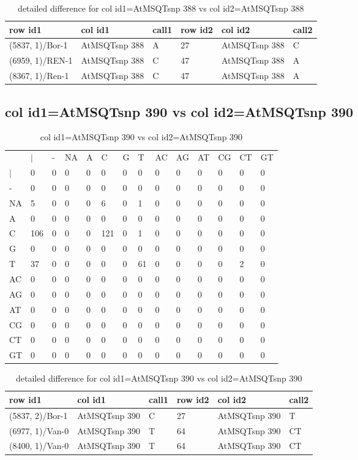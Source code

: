 \begin{center}
\begin{longtable}{|l|l|l|l|l|l|}
\caption{detailed difference for col id1=AtMSQTsnp 388 vs col id2=AtMSQTsnp 388} \label{table_dm895}\\
\hline
row id1&col id1&call1&row id2&col id2&call2\\
\hline
(5837, 1)/Bor-1&AtMSQTsnp 388&A&27&AtMSQTsnp 388&C\\
(6959, 1)/REN-1&AtMSQTsnp 388&C&47&AtMSQTsnp 388&A\\
(8367, 1)/Ren-1&AtMSQTsnp 388&C&47&AtMSQTsnp 388&A\\
\hline
\end{longtable}
\end{center}

\subsection{col id1=AtMSQTsnp 390 vs col id2=AtMSQTsnp 390}
\begin{center}
\begin{longtable}{|l|l|l|l|l|l|l|l|l|l|l|l|l|l|}
\caption{col id1=AtMSQTsnp 390 vs col id2=AtMSQTsnp 390} \label{table_dm896}\\
\hline
\\
\hline
&$|$&-&NA&A&C&G&T&AC&AG&AT&CG&CT&GT\\
$|$&0&0&0&0&0&0&0&0&0&0&0&0&0\\
-&0&0&0&0&0&0&0&0&0&0&0&0&0\\
NA&5&0&0&0&6&0&1&0&0&0&0&0&0\\
A&0&0&0&0&0&0&0&0&0&0&0&0&0\\
C&106&0&0&0&121&0&1&0&0&0&0&0&0\\
G&0&0&0&0&0&0&0&0&0&0&0&0&0\\
T&37&0&0&0&0&0&61&0&0&0&0&2&0\\
AC&0&0&0&0&0&0&0&0&0&0&0&0&0\\
AG&0&0&0&0&0&0&0&0&0&0&0&0&0\\
AT&0&0&0&0&0&0&0&0&0&0&0&0&0\\
CG&0&0&0&0&0&0&0&0&0&0&0&0&0\\
CT&0&0&0&0&0&0&0&0&0&0&0&0&0\\
GT&0&0&0&0&0&0&0&0&0&0&0&0&0\\
\hline
\end{longtable}
\end{center}

\begin{center}
\begin{longtable}{|l|l|l|l|l|l|}
\caption{detailed difference for col id1=AtMSQTsnp 390 vs col id2=AtMSQTsnp 390} \label{table_dm897}\\
\hline
row id1&col id1&call1&row id2&col id2&call2\\
\hline
(5837, 2)/Bor-1&AtMSQTsnp 390&C&27&AtMSQTsnp 390&T\\
(6977, 1)/Van-0&AtMSQTsnp 390&T&64&AtMSQTsnp 390&CT\\
(8400, 1)/Van-0&AtMSQTsnp 390&T&64&AtMSQTsnp 390&CT\\
\hline
\end{longtable}
\end{center}

